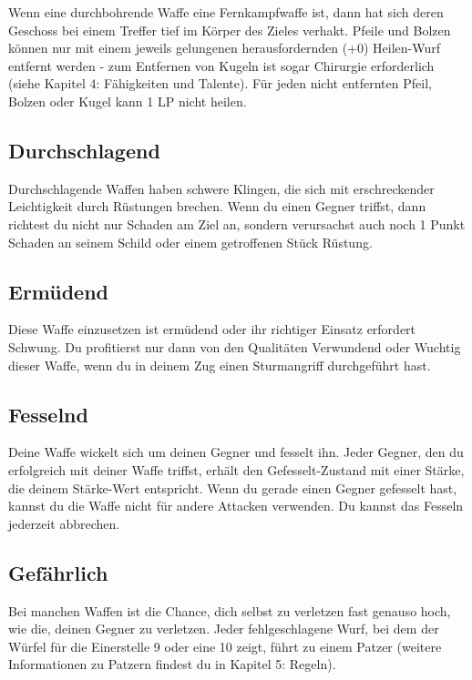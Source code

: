 \documentclass[a4paper, fontsize=9pt twocolumn]{scrartcl}
\begin{document}
\begin{multicols*}{2}
    Wenn eine durchbohrende Waffe eine Fernkampfwaffe ist, dann hat sich deren Geschoss bei einem Treffer tief im Körper des Zieles verhakt.
    Pfeile und Bolzen können nur mit einem jeweils gelungenen herausfordernden (+0) Heilen-Wurf entfernt werden - zum Entfernen von Kugeln ist sogar Chirurgie erforderlich (siehe Kapitel 4: Fähigkeiten und Talente).
    Für jeden nicht entfernten Pfeil, Bolzen oder Kugel kann 1 LP nicht heilen.

    \subsection{Durchschlagend}
    Durchschlagende Waffen haben schwere Klingen, die sich mit erschreckender Leichtigkeit durch Rüstungen brechen.
    Wenn du einen Gegner triffst, dann richtest du nicht nur Schaden am Ziel an, sondern verursachst auch noch 1 Punkt Schaden an seinem Schild oder einem getroffenen Stück Rüstung.

    \subsection{Ermüdend}
    Diese Waffe einzusetzen ist ermüdend oder ihr richtiger Einsatz erfordert Schwung.
    Du profitierst nur dann von den Qualitäten Verwundend oder Wuchtig dieser Waffe, wenn du in deinem Zug einen Sturmangriff durchgeführt hast.

    \subsection{Fesselnd}
    Deine Waffe wickelt sich um deinen Gegner und fesselt ihn. Jeder Gegner, den du erfolgreich mit deiner Waffe triffst, erhält den Gefesselt-Zustand mit einer Stärke, die deinem Stärke-Wert entspricht.
    Wenn du gerade einen Gegner gefesselt hast, kannst du die Waffe nicht für andere Attacken verwenden.
    Du kannst das Fesseln jederzeit abbrechen.

    \subsection{Gefährlich}
    Bei manchen Waffen ist die Chance, dich selbst zu verletzen fast genauso hoch, wie die, deinen Gegner zu verletzen.
    Jeder fehlgeschlagene Wurf, bei dem der Würfel für die Einerstelle 9 oder eine 10 zeigt, führt zu einem Patzer (weitere Informationen zu Patzern findest du in Kapitel 5: Regeln).


\end{multicols*}
\end{document}
